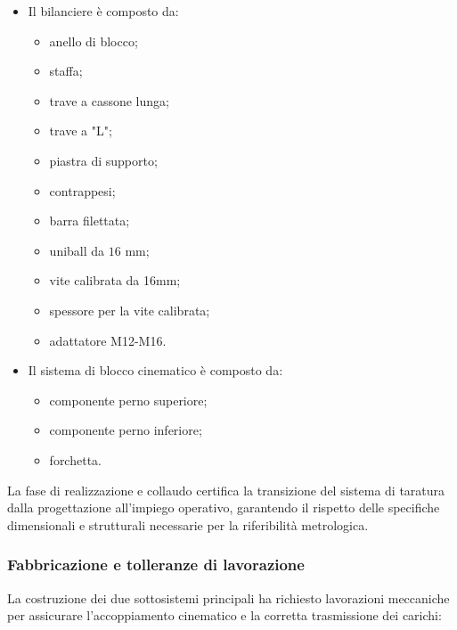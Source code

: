 \documentclass[a4paper, twoside]{article}
\begin{document}
\begin{itemize}
    \item Il bilanciere è composto da:
    
        \begin{itemize}
            \item anello di blocco;
            \item staffa;
            \item trave a cassone lunga;
            \item trave a "L";
            \item piastra di supporto;
            \item contrappesi;
            \item barra filettata;
            \item uniball da $16 \text{ mm}$;
            \item vite calibrata da 16mm;
            \item spessore per la vite calibrata;
            \item adattatore M12-M16.
        \end{itemize}

    \item Il sistema di blocco cinematico è composto da:

        \begin{itemize}
            \item componente perno superiore;
            \item componente perno inferiore;
            \item forchetta.
        \end{itemize}

\end{itemize}

La fase di realizzazione e collaudo certifica la transizione del sistema di taratura dalla progettazione all'impiego operativo, garantendo il rispetto delle specifiche dimensionali e strutturali necessarie per la riferibilità metrologica.

\subsubsection{Fabbricazione e tolleranze di lavorazione}
La costruzione dei due sottosistemi principali ha richiesto lavorazioni meccaniche per assicurare l'accoppiamento cinematico e la corretta trasmissione dei carichi:
\end{document}
